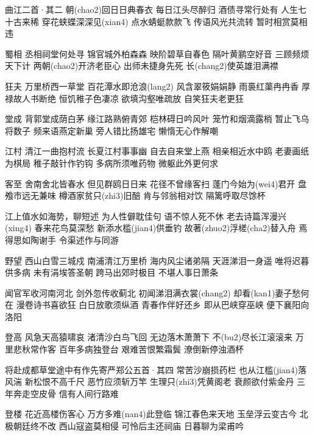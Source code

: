 \documentclass[a4paper]{article}
\makeatletter
\newcommand\cz{\@ifstar{\def\@showczcc{false}\@cz}{\def\@showczcc{true}\@cz}}
\newcommand{\@cz}[1]{\cizu*[pysize=small,pycolorx=red,ccfont=kaiti,ccsize=Huge,gridcolor=red!50!,cc=\@showczcc,griddashcolor=red]{#1}}
\def\poem#1#2{\begin{poembox}{\Huge\hspace{-0.5cm}#1}\cz{#2}\end{poembox}}
\makeatother
\begin{document}

曲江二首·其二
朝(chao2)回日日典春衣 每日江头尽醉归
酒债寻常行处有 人生七十古来稀
穿花蛱蝶深深见(xian4) 点水蜻蜓款款飞
传语风光共流转 暂时相赏莫相违

蜀相
丞相祠堂何处寻 锦官城外柏森森
映阶碧草自春色 隔叶黄鹂空好音
三顾频烦天下计 两朝(chao2)开济老臣心
出师未捷身先死 长(chang2)使英雄泪满襟

狂夫
万里桥西一草堂 百花潭水即沧浪(lang2)
风含翠筱娟娟静 雨裛红蕖冉冉香
厚禄故人书断绝 恒饥稚子色凄凉
欲填沟壑唯疏放 自笑狂夫老更狂

堂成
背郭堂成荫白茅 缘江路熟俯青郊
桤林碍日吟风叶 笼竹和烟滴露梢
暂止飞乌将数子 频来语燕定新巢
旁人错比扬雄宅 懒惰无心作解嘲

江村
清江一曲抱村流 长夏江村事事幽
自去自来堂上燕 相亲相近水中鸥
老妻画纸为棋局 稚子敲针作钓钩
多病所须唯药物 微躯此外更何求

客至
舍南舍北皆春水 但见群鸥日日来
花径不曾缘客扫 蓬门今始为(wei4)君开
盘飧市远无兼味 樽酒家贫只(zhi3)旧醅
肯与邻翁相对饮 隔篱呼取尽馀杯

江上值水如海势，聊短述
为人性僻耽佳句 语不惊人死不休
老去诗篇浑漫兴(xing4) 春来花鸟莫深愁
新添水槛(jian4)供垂钓 故著(zhuo2)浮槎(cha2)替入舟
焉得思如陶谢手 令渠述作与同游

野望
西山白雪三城戍 南浦清江万里桥
海内风尘诸弟隔 天涯涕泪一身遥
唯将迟暮供多病 未有涓埃答圣朝
跨马出郊时极目 不堪人事日萧条

闻官军收河南河北
剑外忽传收蓟北 初闻涕泪满衣裳(chang2)
却看(kan1)妻子愁何在 漫卷诗书喜欲狂
白日放歌须纵酒 青春作伴好还乡
即从巴峡穿巫峡 便下襄阳向洛阳

登高
风急天高猿啸哀 渚清沙白鸟飞回
无边落木萧萧下 不(bu2)尽长江滚滚来
万里悲秋常作客 百年多病独登台
艰难苦恨繁霜鬓 潦倒新停浊酒杯

将赴成都草堂途中有作先寄严郑公五首·其四
常苦沙崩损药栏 也从江槛(jian4)落风湍
新松恨不高千尺 恶竹应须斩万竿
生理只(zhi3)凭黄阁老 衰颜欲付紫金丹
三年奔走空皮骨 信有人间行路难

登楼
花近高楼伤客心 万方多难(nan4)此登临
锦江春色来天地 玉垒浮云变古今
北极朝廷终不改 西山寇盗莫相侵
可怜后主还祠庙 日暮聊为梁甫吟
\end{document}
